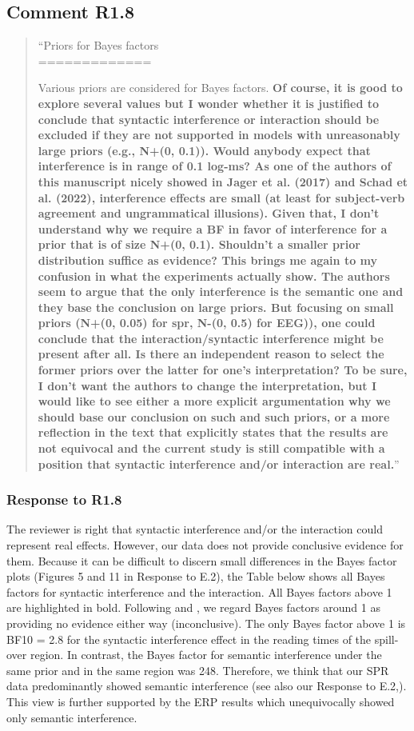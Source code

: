 \documentclass[12pt]{article}
\begin{document}
\subsection*{Comment R1.8}
\begin{quote}
``Priors for Bayes factors\\
=============

Various priors are considered for Bayes factors. \textbf{Of course, it is good to explore several values but I wonder whether it is justified to conclude that syntactic interference or interaction should be excluded if they are not supported in models with unreasonably large priors (e.g., N+(0, 0.1)). Would anybody expect that interference is in range of 0.1 log-ms? As one of the authors of this manuscript nicely showed in Jager et al. (2017) and Schad et al. (2022), interference effects are small (at least for subject-verb agreement and ungrammatical illusions). Given that, I don't understand why we require a BF in favor of interference for a prior that is of size N+(0, 0.1). Shouldn't a smaller prior distribution suffice as evidence? This brings me again to my confusion in what the experiments actually show. The authors seem to argue that the only interference is the semantic one and they base the conclusion on large priors. But focusing on small priors (N+(0, 0.05) for spr, N-(0, 0.5) for EEG)), one could conclude that the interaction/syntactic interference might be present after all. Is there an independent reason to select the former priors over the latter for one's interpretation? To be sure, I don't want the authors to change the interpretation, but I would like to see either a more explicit argumentation why we should base our conclusion on such and such priors, or a more reflection in the text that explicitly states that the results are not equivocal and the current study is still compatible with a position that syntactic interference and/or interaction are real.}''\end{quote}

\subsubsection*{Response to R1.8}
The reviewer is right that syntactic interference and/or the interaction could represent real effects. However, our data does not provide conclusive evidence for them. Because it can be difficult to discern small differences in the Bayes factor plots (Figures 5 and 11 in Response to E.2), the Table below shows all Bayes factors for syntactic interference and the interaction. All Bayes factors above 1 are highlighted in bold. Following \textcite{jeffreys1998theory} and \textcite{lee2014bayesian}, we regard Bayes factors around 1 as providing no evidence either way (inconclusive). The only Bayes factor above 1 is BF10 = 2.8 for the syntactic interference effect in the reading times of the spill-over region. In contrast, the Bayes factor for semantic interference under the same prior and in the same region was 248. Therefore, we think that our SPR data predominantly showed semantic interference (see also our Response to E.2,). This view is further supported by the ERP results which unequivocally showed only semantic interference.
\end{document}
